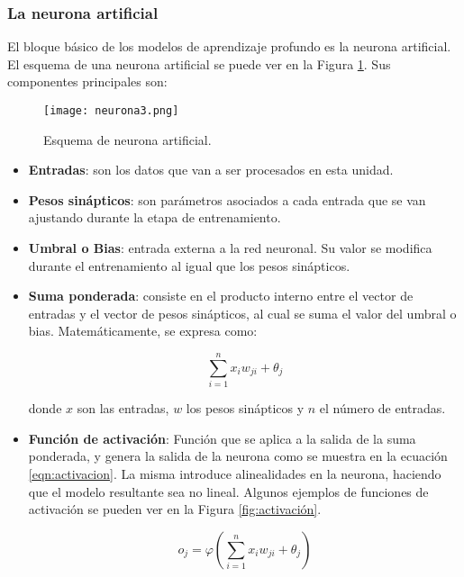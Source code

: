 \subsubsection{La neurona artificial}
El bloque básico de los modelos de aprendizaje profundo es la neurona artificial. El esquema de una neurona artificial se puede ver en la Figura \ref{fig:neurona}. Sus componentes principales son: 

\begin{figure}[H]
  \centering{}
  \texttt{[image: neurona3.png]}
  \caption{Esquema de neurona artificial.}
  \label{fig:neurona}
\end{figure}

\begin{itemize}
    \item \textbf{Entradas}: son los datos que van a ser procesados en esta unidad.
    
    \item \textbf{Pesos sinápticos}: son parámetros asociados a cada entrada que se van ajustando durante la etapa de entrenamiento. 

	\item \textbf{Umbral o Bias}: entrada externa a la red neuronal. Su valor se modifica durante el entrenamiento al igual que los pesos sinápticos.

    \item \textbf{Suma ponderada}: consiste en el producto interno entre el vector de entradas y el vector de pesos sinápticos, al cual se suma el valor del umbral o bias. Matemáticamente, se expresa como:
    
    \begin{equation}
\label{eqn:suma_ponderada}
	\sum_{i=1}^{n}x_{i}w_{ji} +\theta_{j}
\end{equation}
    
    donde $x$ son las entradas, $w$ los pesos sinápticos y $n$ el número de entradas.
	
    \item \textbf{Función de activación}: Función que se aplica a la salida de la suma ponderada, y genera la salida de la neurona como se muestra en la ecuación \ref{eqn:activacion}. La misma introduce alinealidades en la neurona, haciendo que el modelo resultante sea no lineal. Algunos ejemplos de funciones de activación se pueden ver en la Figura \ref{fig:activación}. 
    
\begin{equation}
\label{eqn:activacion}
	o_{j} = \varphi (\sum_{i=1}^{n}x_{i}w_{ji}+\theta_{j})
\end{equation}
     
\end{itemize}



